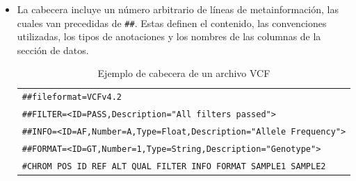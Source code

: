 \documentclass[11pt,spanish,listoffigures,listoftables]{tfgetsinf}
\begin{document}
\begin{itemize}
   \item La cabecera incluye un número arbitrario de líneas de metainformación, las cuales van precedidas de \texttt{\#\#}. Estas definen el contenido, las convenciones utilizadas, los tipos de anotaciones y los nombres de las columnas de la sección de datos\cite{DAN}.
      \begin{table}[H]
         \centering
         \caption{Ejemplo de cabecera de un archivo \acs{VCF}}
         \begin{tabular}{|l|}
         \hline
         \texttt{\#\#fileformat=\acs{VCF}v4.2} \\
         \texttt{\#\#FILTER=<ID=PASS,Description="All filters passed">} \\
         \texttt{\#\#INFO=<ID=AF,Number=A,Type=Float,Description="Allele Frequency">} \\
         \texttt{\#\#FORMAT=<ID=GT,Number=1,Type=String,Description="Genotype">} \\
         \texttt{\#CHROM POS ID REF ALT QUAL FILTER INFO FORMAT SAMPLE1 SAMPLE2} \\
         \hline
         \end{tabular}
         \label{tabla:cabeceraVCF}
      \end{table}
      

\end{itemize}
\end{document}

